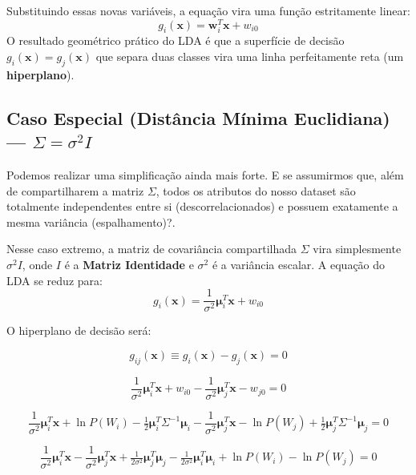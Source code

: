 \documentclass[12pt, a4paper]{article}
\begin{document}
Substituindo essas novas variáveis, a equação vira uma função estritamente linear:
\begin{equation}
    \boxed{g_i(\mathbf{x}) = \mathbf{w}_i^T\mathbf{x} + w_{i0}} \label{eq:lda}
\end{equation}
\noindent O resultado geométrico prático do LDA é que a superfície de decisão $g_i(\mathbf{x}) = g_j(\mathbf{x})$ que separa duas classes vira uma linha perfeitamente reta (um \textbf{hiperplano}).

\subsection{Caso Especial (Distância Mínima Euclidiana) --- $\Sigma = \sigma^2 I$}
Podemos realizar uma simplificação ainda mais forte. E se assumirmos que, além de compartilharem a matriz $\Sigma$, todos os atributos do nosso dataset são totalmente independentes entre si (descorrelacionados) e possuem exatamente a mesma variância (espalhamento)?.

Nesse caso extremo, a matriz de covariância compartilhada $\Sigma$ vira simplesmente $\sigma^2 I$, onde $I$ é a \textbf{Matriz Identidade} e $\sigma^2$ é a variância escalar. A equação do LDA se reduz para:
\begin{equation}
    g_i(\mathbf{x}) = \frac{1}{\sigma^2}\boldsymbol{\mu}_i^T\mathbf{x} + w_{i0} \label{eq:lda_esferico}
\end{equation}

O hiperplano de decisão será:

\begin{equation*}
    g_{ij} (\mathbf{x}) \equiv
    g_i(\mathbf{x}) - g_j(\mathbf{x}) = 0
\end{equation*}

\begin{equation*}
    \frac{1}{\sigma^2}\boldsymbol{\mu}_i^T\mathbf{x} + w_{i0} 
    -
    \frac{1}{\sigma^2}\boldsymbol{\mu}_j^T\mathbf{x} - w_{j0}
    = 0
\end{equation*}

\begin{equation*}
    \frac{1}{\sigma^2}\boldsymbol{\mu}_i^T\mathbf{x} + \ln P(W_i) - \tfrac{1}{2}\boldsymbol{\mu}_i^T\Sigma^{-1}\boldsymbol{\mu}_i 
    -
    \frac{1}{\sigma^2}\boldsymbol{\mu}_j^T\mathbf{x} - \ln P(W_j) + \tfrac{1}{2}\boldsymbol{\mu}_j^T\Sigma^{-1}\boldsymbol{\mu}_j
    = 0
\end{equation*}

\begin{equation*}
    \frac{1}{\sigma^2}\boldsymbol{\mu}_i^T\mathbf{x} 
    - \frac{1}{\sigma^2}\boldsymbol{\mu}_j^T\mathbf{x} 
    + \tfrac{1}{2\sigma^2}\boldsymbol{\mu}_j^T\boldsymbol{\mu}_j
    - \tfrac{1}{2\sigma^2}\boldsymbol{\mu}_i^T\boldsymbol{\mu}_i 
    + \ln P(W_i) 
    - \ln P(W_j) 
    = 0
\end{equation*}
\end{document}
